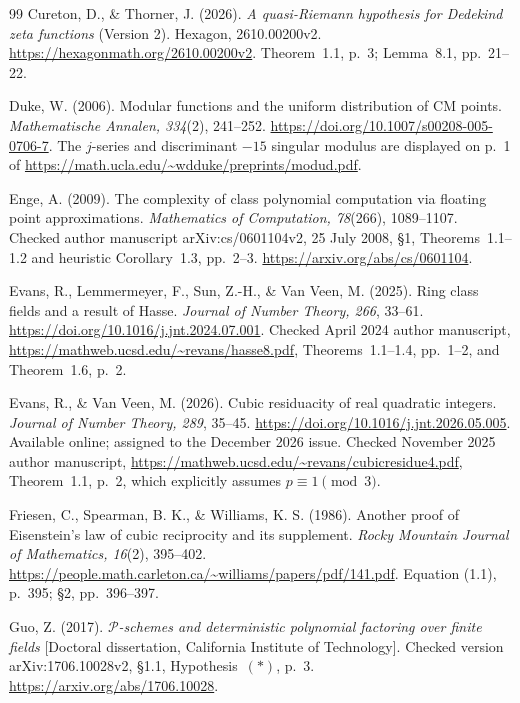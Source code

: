 \documentclass[11pt]{article}
\theoremstyle{definition}
\theoremstyle{remark}
\begin{document}
\begin{thebibliography}{99}
Cureton, D., \& Thorner, J. (2026).
\emph{A quasi-Riemann hypothesis for Dedekind zeta functions}
(Version 2). Hexagon, 2610.00200v2.
\url{https://hexagonmath.org/2610.00200v2}.
Theorem~1.1, p.~3; Lemma~8.1, pp.~21--22.

Duke, W. (2006).
Modular functions and the uniform distribution of CM points.
\emph{Mathematische Annalen, 334}(2), 241--252.
\url{https://doi.org/10.1007/s00208-005-0706-7}.
The $j$-series and discriminant $-15$ singular modulus are displayed
on p.~1 of \url{https://math.ucla.edu/~wdduke/preprints/modud.pdf}.

Enge, A. (2009).
The complexity of class polynomial computation via floating point
approximations.
\emph{Mathematics of Computation, 78}(266), 1089--1107.
Checked author manuscript arXiv:cs/0601104v2, 25 July 2008,
\S1, Theorems~1.1--1.2 and heuristic Corollary~1.3, pp.~2--3.
\url{https://arxiv.org/abs/cs/0601104}.

Evans, R., Lemmermeyer, F., Sun, Z.-H., \& Van Veen, M. (2025).
Ring class fields and a result of Hasse.
\emph{Journal of Number Theory, 266}, 33--61.
\url{https://doi.org/10.1016/j.jnt.2024.07.001}.
Checked April 2024 author manuscript,
\url{https://mathweb.ucsd.edu/~revans/hasse8.pdf},
Theorems~1.1--1.4, pp.~1--2, and Theorem~1.6, p.~2.

Evans, R., \& Van Veen, M. (2026).
Cubic residuacity of real quadratic integers.
\emph{Journal of Number Theory, 289}, 35--45.
\url{https://doi.org/10.1016/j.jnt.2026.05.005}.
Available online; assigned to the December 2026 issue.
Checked November 2025 author manuscript,
\url{https://mathweb.ucsd.edu/~revans/cubicresidue4.pdf},
Theorem~1.1, p.~2, which explicitly assumes $p\equiv1\pmod3$.

Friesen, C., Spearman, B. K., \& Williams, K. S. (1986).
Another proof of Eisenstein's law of cubic reciprocity and its supplement.
\emph{Rocky Mountain Journal of Mathematics, 16}(2), 395--402.
\url{https://people.math.carleton.ca/~williams/papers/pdf/141.pdf}.
Equation (1.1), p.~395; \S2, pp.~396--397.

Guo, Z. (2017).
\emph{$\mathcal P$-schemes and deterministic polynomial factoring over finite fields}
[Doctoral dissertation, California Institute of Technology].
Checked version arXiv:1706.10028v2, \S1.1, Hypothesis~$(*)$, p.~3.
\url{https://arxiv.org/abs/1706.10028}.


\end{thebibliography}
\end{document}
